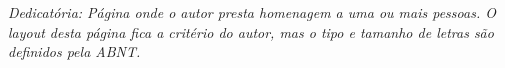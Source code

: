 


\begin{newpage}
	\thispagestyle{empty}
	\setlength{\baselineskip}{1.5\baselineskip} %
	\begin{flushright}
		\begin{minipage}{12cm}
			
			\textit{Dedicatória: Página onde o autor presta homenagem a uma ou mais pessoas.
                        	O layout desta página fica a critério do autor, mas o tipo e tamanho de letras são definidos pela ABNT.}

			
			
		\end{minipage}
	\end{flushright}
\end{newpage}

\clearpage